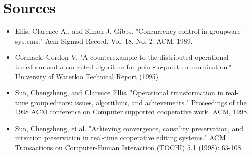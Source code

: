 \documentclass{article}
\begin{document}
\section{Sources}
\begin{itemize}
	\item Ellis, Clarence A., and Simon J. Gibbs. "Concurrency control in groupware systems." Acm Sigmod Record. Vol. 18. No. 2. ACM, 1989.
	\item Cormack, Gordon V. "A counterexample to the distributed operational transform and a corrected algorithm for point-to-point communication." University of Waterloo Technical Report (1995).
	\item Sun, Chengzheng, and Clarence Ellis. "Operational transformation in real-time group editors: issues, algorithms, and achievements." Proceedings of the 1998 ACM conference on Computer supported cooperative work. ACM, 1998.
	\item Sun, Chengzheng, et al. "Achieving convergence, causality preservation, and intention preservation in real-time cooperative editing systems." ACM Transactions on Computer-Human Interaction (TOCHI) 5.1 (1998): 63-108.
\end{itemize}
\end{document}
